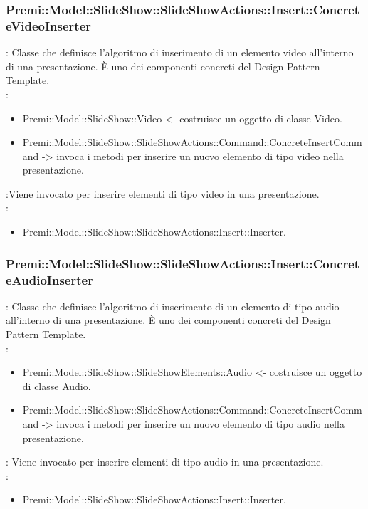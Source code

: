 {            \subsubsection{Premi::Model::SlideShow::SlideShowActions::Insert::ConcreteVideoInserter}{
				\textbf{\tipo}: Classe che definisce l'algoritmo di inserimento di un elemento video all’interno di una presentazione.
È uno dei componenti concreti del Design Pattern Template.\\	
				\textbf{\relaz}: 
				\begin{itemize}
            		\item Premi::Model::SlideShow::Video <- costruisce un oggetto di classe Video.
					\item Premi::Model::SlideShow::SlideShowActions::Command::ConcreteInsertCommand -> invoca i metodi per inserire un nuovo elemento di tipo video nella presentazione.
				\end{itemize} 
				\textbf{\interfacce}:Viene invocato per inserire elementi di tipo video in una presentazione.\\
                \textbf{\base}: 
                    \begin{itemize}
                    \item Premi::Model::SlideShow::SlideShowActions::Insert::Inserter.
                    \end{itemize}
			}
            \subsubsection{Premi::Model::SlideShow::SlideShowActions::Insert::ConcreteAudioInserter}{
				\textbf{\tipo}: Classe che definisce l'algoritmo di inserimento di un elemento di tipo audio all’interno di una presentazione.
È uno dei componenti concreti del Design Pattern Template.\\	
				\textbf{\relaz}: 
				\begin{itemize}
				\item Premi::Model::SlideShow::SlideShowElements::Audio <- costruisce un oggetto di classe Audio.
				\item Premi::Model::SlideShow::SlideShowActions::Command::ConcreteInsertCommand -> invoca i metodi per inserire un nuovo elemento di tipo audio nella presentazione.
				\end{itemize} 
				\textbf{\interfacce}: Viene invocato per inserire elementi di tipo audio in una presentazione.\\
                \textbf{\base}: 
                    \begin{itemize}
                    \item Premi::Model::SlideShow::SlideShowActions::Insert::Inserter.
                    \end{itemize}
			}
}
